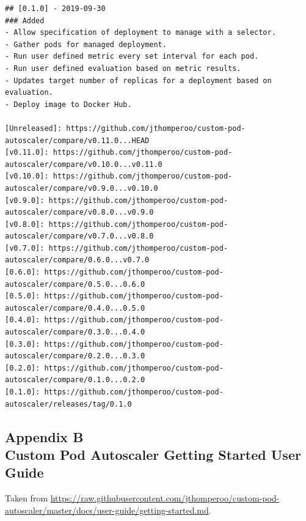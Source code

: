 \begin{lstlisting}
## [0.1.0] - 2019-09-30
### Added
- Allow specification of deployment to manage with a selector.
- Gather pods for managed deployment.
- Run user defined metric every set interval for each pod.
- Run user defined evaluation based on metric results.
- Updates target number of replicas for a deployment based on evaluation.
- Deploy image to Docker Hub.

[Unreleased]: https://github.com/jthomperoo/custom-pod-autoscaler/compare/v0.11.0...HEAD
[v0.11.0]: https://github.com/jthomperoo/custom-pod-autoscaler/compare/v0.10.0...v0.11.0
[v0.10.0]: https://github.com/jthomperoo/custom-pod-autoscaler/compare/v0.9.0...v0.10.0
[v0.9.0]: https://github.com/jthomperoo/custom-pod-autoscaler/compare/v0.8.0...v0.9.0
[v0.8.0]: https://github.com/jthomperoo/custom-pod-autoscaler/compare/v0.7.0...v0.8.0
[v0.7.0]: https://github.com/jthomperoo/custom-pod-autoscaler/compare/0.6.0...v0.7.0
[0.6.0]: https://github.com/jthomperoo/custom-pod-autoscaler/compare/0.5.0...0.6.0
[0.5.0]: https://github.com/jthomperoo/custom-pod-autoscaler/compare/0.4.0...0.5.0
[0.4.0]: https://github.com/jthomperoo/custom-pod-autoscaler/compare/0.3.0...0.4.0
[0.3.0]: https://github.com/jthomperoo/custom-pod-autoscaler/compare/0.2.0...0.3.0
[0.2.0]: https://github.com/jthomperoo/custom-pod-autoscaler/compare/0.1.0...0.2.0
[0.1.0]: https://github.com/jthomperoo/custom-pod-autoscaler/releases/tag/0.1.0
\end{lstlisting}

\subsection*{%
    Appendix B \\
    \small Custom Pod Autoscaler Getting Started User Guide}

Taken from
\url{https://raw.githubusercontent.com/jthomperoo/custom-pod-autoscaler/master/docs/user-guide/getting-started.md}.

